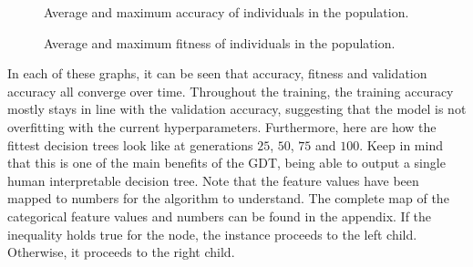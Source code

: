 \documentclass[12pt]{article}
\begin{document}
\begin{figure}[H]
    \centering
    \caption{Average and maximum accuracy of individuals in the population.}
\end{figure}

\begin{figure}[H]
    \centering
    \caption{Average and maximum fitness of individuals in the population.}
\end{figure}

In each of these graphs, it can be seen that accuracy, fitness and validation accuracy all converge over time. Throughout the training, the training accuracy mostly stays in line with the validation accuracy, suggesting that the model is not overfitting with the current hyperparameters. Furthermore, here are how the fittest decision trees look like at generations $25$, $50$, $75$ and $100$. Keep in mind that this is one of the main benefits of the GDT, being able to output a single human interpretable decision tree. Note that the feature values have been mapped to numbers for the algorithm to understand. The complete map of the categorical feature values and numbers can be found in the appendix. If the inequality holds true for the node, the instance proceeds to the left child. Otherwise, it proceeds to the right child.
\end{document}
